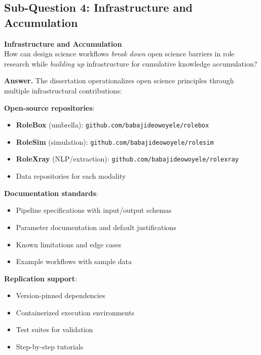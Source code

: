\documentclass[../main.tex]{subfiles}
\begin{document}
\subsection{Sub-Question 4: Infrastructure and Accumulation}

\begin{subrq}
\textbf{Infrastructure and Accumulation}\\
How can design science workflows \emph{break down} open science barriers in role research while \emph{building up} infrastructure for cumulative knowledge accumulation?
\end{subrq}

\noindent\textbf{Answer.} The dissertation operationalizes open science principles through multiple infrastructural contributions:

\textbf{Open-source repositories}:
\begin{itemize}[leftmargin=*, itemsep=0.2em]
\item \textbf{RoleBox} (umbrella): \texttt{github.com/babajideowoyele/rolebox}
\item \textbf{RoleSim} (simulation): \texttt{github.com/babajideowoyele/rolesim}
\item \textbf{RoleXray} (NLP/extraction): \texttt{github.com/babajideowoyele/rolexray}
\item Data repositories for each modality
\end{itemize}

\textbf{Documentation standards}:
\begin{itemize}[leftmargin=*, itemsep=0.2em]
\item Pipeline specifications with input/output schemas
\item Parameter documentation and default justifications
\item Known limitations and edge cases
\item Example workflows with sample data
\end{itemize}

\textbf{Replication support}:
\begin{itemize}[leftmargin=*, itemsep=0.2em]
\item Version-pinned dependencies
\item Containerized execution environments
\item Test suites for validation
\item Step-by-step tutorials
\end{itemize}
\end{document}
